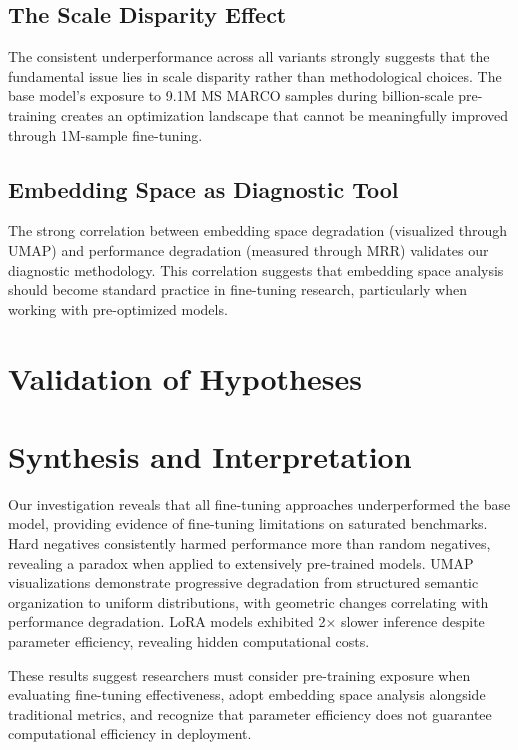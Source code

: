 \subsection{The Scale Disparity Effect}

The consistent underperformance across all variants strongly suggests that the fundamental issue lies in scale disparity rather than methodological choices. The base model's exposure to 9.1M MS MARCO samples during billion-scale pre-training creates an optimization landscape that cannot be meaningfully improved through 1M-sample fine-tuning.

\subsection{Embedding Space as Diagnostic Tool}

The strong correlation between embedding space degradation (visualized through UMAP) and performance degradation (measured through MRR) validates our diagnostic methodology. This correlation suggests that embedding space analysis should become standard practice in fine-tuning research, particularly when working with pre-optimized models.

\section{Validation of Hypotheses}

\section{Synthesis and Interpretation}

Our investigation reveals that all fine-tuning approaches underperformed the base model, providing evidence of fine-tuning limitations on saturated benchmarks. Hard negatives consistently harmed performance more than random negatives, revealing a paradox when applied to extensively pre-trained models. UMAP visualizations demonstrate progressive degradation from structured semantic organization to uniform distributions, with geometric changes correlating with performance degradation. LoRA models exhibited 2× slower inference despite parameter efficiency, revealing hidden computational costs.

These results suggest researchers must consider pre-training exposure when evaluating fine-tuning effectiveness, adopt embedding space analysis alongside traditional metrics, and recognize that parameter efficiency does not guarantee computational efficiency in deployment.
